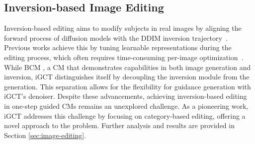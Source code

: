 \subsection{Inversion-based Image Editing}
\vspace{-0.15cm}
Inversion-based editing aims to modify subjects in real images by aligning the forward process of diffusion models with the DDIM inversion trajectory~\cite{song2022denoisingdiffusionimplicitmodels}. Previous works achieve this by tuning learnable representations during the editing process, which often requires time-consuming per-image optimization~\cite{dong2023prompt,li2023stylediffusion,mokady2023null}. While BCM \cite{li2024bidirectional}, a CM that demonstrates capabilities in both image generation and inversion, iGCT distinguishes itself by decoupling the inversion module from the generation. This separation allows for the flexibility for guidance generation with iGCT's denoiser. Despite these advancements, achieving inversion-based editing in one-step guided CMs remains an unexplored challenge. As a pioneering work, iGCT addresses this challenge by focusing on category-based editing, offering a novel approach to the problem. Further analysis and results are provided in Section \ref{sec:image-editing}.
